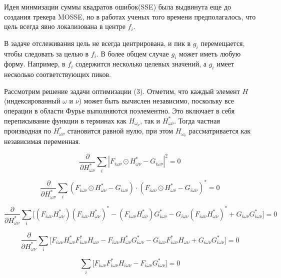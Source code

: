 \documentclass[a4paper,14pt]{extarticle}
\begin{document}
Идея минмизации суммы квадратов ошибок(SSE) была выдвинута еще до создания трекера MOSSE, но в работах ученых того времени предполагалось, что цель всегда явно локализована в центре $f_i$. 

В задаче отслеживания цель не всегда центрирована, и пик в $g_i$ перемещается, чтобы следовать за целью в $f_i$. В более общем случае $g_i$ может иметь любую форму. Например, в $f_i$ содержится несколько целевых значений, а $g_i$ имеет несколько соответствующих пиков. 


Рассмотрим решение задачи оптимизации (3). Отметим, что каждый элемент $H$ (индексированный $\omega$ и $\nu$)
может быть вычислен независимо, поскольку все операции в области Фурье выполняются поэлементно. Это включает в себя переписывание функции в терминах как $H_\omega_\nu$, так и $H^*_{\omega\nu}$. Тогда частная производная по $H^*_{\omega\nu}$ становится равной нулю, при этом $H_\omega_\nu$ рассматривается как независимая переменная.


\begin{equation}
     \frac{\partial}{\partial H^*_{\omega\nu}}\sum_i |F_{i\omega\nu} \odot H^*_{\omega\nu} - G_{i\omega\nu}|^2 = 0
\end{equation}

\begin{equation}
     \frac{\partial}{\partial H^*_{\omega\nu}}\sum_i (F_{i\omega\nu} \odot H^*_{\omega\nu} - G_{i\omega\nu})\cdot (F_{i\omega\nu} \odot H^*_{\omega\nu} - G_{i\omega\nu})^* = 0
\end{equation}

\begin{equation}
     \frac{\partial}{\partial H^*_{\omega\nu}}\sum_i \Big[(F_{i\omega\nu}H^*_{\omega\nu})(F_{i\omega\nu}H^*_{\omega\nu})^* - (F_{i\omega\nu}H^*_{\omega\nu})G^*_{i\omega\nu} - G_{i\omega\nu}(F_{i\omega\nu}H^*_{\omega\nu})^* + G_{i\omega\nu}G^*_{i\omega\nu}\Big] = 0
\end{equation}

\begin{equation}
     \frac{\partial}{\partial H^*_{\omega\nu}}\sum_i \Big[F_{i\omega\nu}H^*_{\omega\nu}F_{i\omega\nu}^*H_{\omega\nu} - F_{i\omega\nu}H^*_{\omega\nu}G^*_{i\omega\nu} - G_{i\omega\nu}F_{i\omega\nu}^*H_{\omega\nu} + G_{i\omega\nu}G^*_{i\omega\nu}\Big] = 0
\end{equation}

\begin{equation}
    \sum_i \Big[F_{i\omega\nu}F^*_{i\omega\nu}H_{i\omega\nu} - F_{i\omega\nu}G^*_{i\omega\nu}\Big]= 0
\end{equation}
\end{document}
